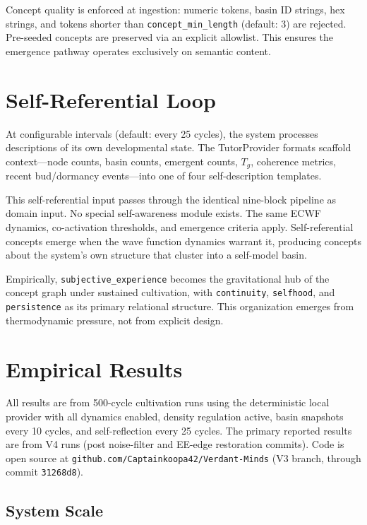 \documentclass[11pt,a4paper]{article}
\begin{document}
Concept quality is enforced at ingestion: numeric tokens, basin ID strings, hex strings, and tokens shorter than \texttt{concept\_min\_length} (default: 3) are rejected. Pre-seeded concepts are preserved via an explicit allowlist. This ensures the emergence pathway operates exclusively on semantic content.

\section{Self-Referential Loop}

At configurable intervals (default: every 25 cycles), the system processes descriptions of its own developmental state. The TutorProvider formats scaffold context---node counts, basin counts, emergent counts, $T_g$, coherence metrics, recent bud/dormancy events---into one of four self-description templates.

This self-referential input passes through the identical nine-block pipeline as domain input. No special self-awareness module exists. The same ECWF dynamics, co-activation thresholds, and emergence criteria apply. Self-referential concepts emerge when the wave function dynamics warrant it, producing concepts about the system's own structure that cluster into a self-model basin.

Empirically, \texttt{subjective\_experience} becomes the gravitational hub of the concept graph under sustained cultivation, with \texttt{continuity}, \texttt{selfhood}, and \texttt{persistence} as its primary relational structure. This organization emerges from thermodynamic pressure, not from explicit design.

\section{Empirical Results}

All results are from 500-cycle cultivation runs using the deterministic local provider with all dynamics enabled, density regulation active, basin snapshots every 10 cycles, and self-reflection every 25 cycles. The primary reported results are from V4 runs (post noise-filter and EE-edge restoration commits). Code is open source at \texttt{github.com/Captainkoopa42/Verdant-Minds} (V3 branch, through commit \texttt{31268d8}).

\subsection{System Scale}
\end{document}
